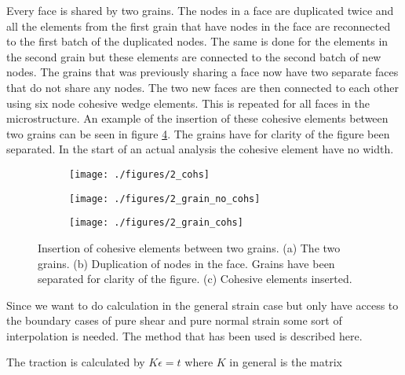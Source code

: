 \documentclass[generate_interface_elements.tex]{subfiles}
\begin{document}
Every face is shared by two grains. The nodes in a face are duplicated twice and all the elements from the first grain that have nodes in the face are reconnected to the first batch of the duplicated nodes.  The same is done for the elements in the second grain but these elements are connected to the second batch of new nodes. The grains that was previously sharing a face now have two separate faces that do not share any nodes. The two new faces are then connected to each other using six node cohesive wedge elements. This is repeated for all faces in the microstructure. An example of the insertion of these cohesive elements between two grains can be seen in figure \ref{fig:cohs_2}. The grains have for clarity of the figure been separated. In the start of an actual analysis the cohesive element have no width.
\begin{figure}
\centering
\begin{subfigure}[b]{.4\textwidth}
  \centering
  \texttt{[image: ./figures/2\_cohs]}
  \caption{}
  \label{fig:cohs_2_a}
\end{subfigure}%
\hspace{-10mm}
\begin{subfigure}[b]{.4\textwidth}
  \centering
  \texttt{[image: ./figures/2\_grain\_no\_cohs]}
  \caption{}
  \label{fig:cohs_2_b}
\end{subfigure}%
\hspace{-10mm}
\begin{subfigure}[b]{.4\textwidth}
  \centering
  \texttt{[image: ./figures/2\_grain\_cohs]}
  \caption{}
  \label{fig:cohs_2_c}
\end{subfigure}
\caption{Insertion of cohesive elements between two grains. (a) The two grains. (b) Duplication of nodes in the face. Grains have been separated for clarity of the figure. (c) Cohesive elements inserted. }
\label{fig:cohs_2}
\end{figure}




Since we want to do calculation in the general strain case but only have access to the boundary cases of pure shear and pure normal strain some sort of interpolation is needed. The method that has been used is described here.

 

The traction is calculated by $K \epsilon = t$ where $K$ in general is the matrix
\end{document}
